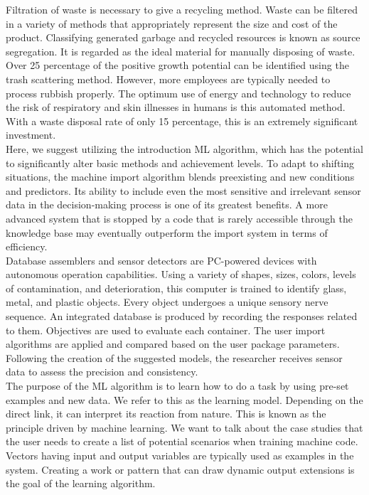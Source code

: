 \documentclass[a4paper,11pt,onecolumn]{article}
\begin{document}
Filtration of waste is necessary to give a recycling method. Waste can be filtered in a variety of methods that appropriately represent the size and cost of the product. Classifying generated garbage and recycled resources is known as source segregation. It is regarded as the ideal material for manually disposing of waste. Over 25 percentage of the positive growth potential can be identified using the trash scattering method. However, more employees are typically needed to process rubbish properly. The optimum use of energy and technology to reduce the risk of respiratory and skin illnesses in humans is this automated method. With a waste disposal rate of only 15 percentage, this is an extremely significant investment.\\
Here, we suggest utilizing the introduction ML algorithm, which has the potential to significantly alter basic methods and achievement levels. To adapt to shifting situations, the machine import algorithm blends preexisting and new conditions and predictors. Its ability to include even the most sensitive and irrelevant sensor data in the decision-making process is one of its greatest benefits. A more advanced system that is stopped by a code that is rarely accessible through the knowledge base may eventually outperform the import system in terms of efficiency.\\
Database assemblers and sensor detectors are PC-powered devices with autonomous operation capabilities. Using a variety of shapes, sizes, colors, levels of contamination, and deterioration, this computer is trained to identify glass, metal, and plastic objects. Every object undergoes a unique sensory nerve sequence. An integrated database is produced by recording the responses related to them. Objectives are used to evaluate each container. The user import algorithms are applied and compared based on the user package parameters. Following the creation of the suggested models, the researcher receives sensor data to assess the precision and consistency. \\
The purpose of the ML algorithm is to learn how to do a task by using pre-set examples and new data. We refer to this as the learning model. Depending on the direct link, it can interpret its reaction from nature. This is known as the principle driven by machine learning. We want to talk about the case studies that the user needs to create a list of potential scenarios when training machine code. Vectors having input and output variables are typically used as examples in the system. Creating a work or pattern that can draw dynamic output extensions is the goal of the learning algorithm. \\
\end{document}
